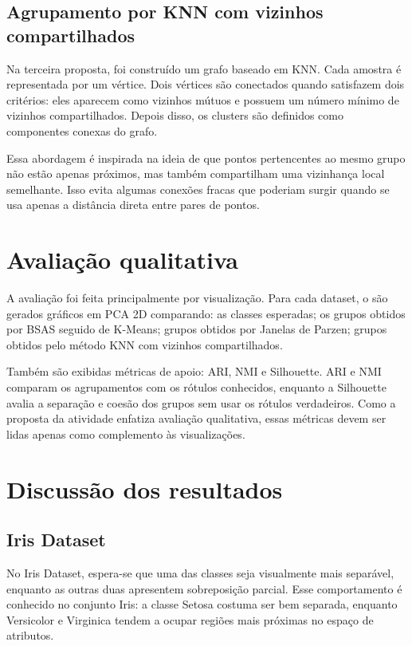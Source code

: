 \documentclass[12pt,a4paper]{article}
\begin{document}
\subsection{Agrupamento por KNN com vizinhos compartilhados}

Na terceira proposta, foi construído um grafo baseado em KNN. Cada amostra é
representada por um vértice. Dois vértices são conectados quando satisfazem dois
critérios: eles aparecem como vizinhos mútuos e possuem um número mínimo de
vizinhos compartilhados. Depois disso, os clusters são definidos como
componentes conexas do grafo.

Essa abordagem é inspirada na ideia de que pontos pertencentes ao mesmo grupo
não estão apenas próximos, mas também compartilham uma vizinhança local
semelhante. Isso evita algumas conexões fracas que poderiam surgir quando se usa
apenas a distância direta entre pares de pontos.

\section{Avaliação qualitativa}

A avaliação foi feita principalmente por visualização. Para cada dataset, o
são gerados gráficos em PCA 2D comparando:
as classes esperadas; os grupos obtidos por BSAS seguido de K-Means; grupos obtidos por Janelas de Parzen; grupos obtidos pelo método KNN com vizinhos compartilhados.


Também são exibidas métricas de apoio: ARI, NMI e Silhouette. ARI e NMI comparam
os agrupamentos com os rótulos conhecidos, enquanto a Silhouette avalia a
separação e coesão dos grupos sem usar os rótulos verdadeiros. Como a proposta
da atividade enfatiza avaliação qualitativa, essas métricas devem ser lidas
apenas como complemento às visualizações.

\section{Discussão dos resultados}

\subsection{Iris Dataset}

No Iris Dataset, espera-se que uma das classes seja visualmente mais separável,
enquanto as outras duas apresentem sobreposição parcial. Esse comportamento é
conhecido no conjunto Iris: a classe Setosa costuma ser bem separada, enquanto
Versicolor e Virginica tendem a ocupar regiões mais próximas no espaço de
atributos.
\end{document}
